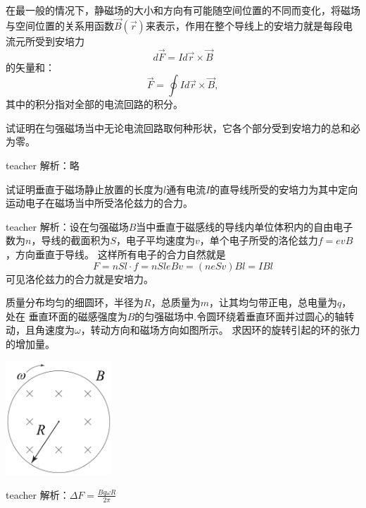 在最一般的情况下，静磁场的大小和方向有可能随空间位置的不同而变化，将磁场与空间位置的关系用函数$\vec{B}(\vec{r})$来表示，作用在整个导线上的安培力就是每段电流元所受到安培力
\begin{equation}
d\vec{F} = Id\vec{r}\times \vec{B}
\end{equation}
的矢量和：
\begin{equation}
\vec{F}=\oint Id\vec{r}\times \vec{B},
\end{equation}
其中的积分指对全部的电流回路的积分。


\begin{example}
试证明在匀强磁场当中无论电流回路取何种形状，它各个部分受到安培力的总和必为零。
\begin{taggedblock}{teacher}
\newline
解析：略
\end{taggedblock}
\end{example}

\begin{example}
试证明垂直于磁场静止放置的长度为$l$通有电流$I$的直导线所受的安培力为其中定向运动电子在磁场当中所受洛伦兹力的合力。
\begin{taggedblock}{teacher}
\newline
解析：设在匀强磁场$B$当中垂直于磁感线的导线内单位体积内的自由电子数为$n$，导线的截面积为$S$，电子平均速度为$v$，单个电子所受的洛伦兹力$f=evB$，方向垂直于导线。
这样所有电子的合力自然就是
\[F=nSl\cdot f = nSleBv = (neSv)Bl=IBl\]
可见洛伦兹力的合力就是安培力。
\end{taggedblock}
\end{example}



\begin{example}

质量分布均匀的细圆环，半径为$R $，总质量为$m$，让其均匀带正电，总电量为$q$，处在
垂直环面的磁感强度为$B$的匀强磁场中.令圆环绕着垂直环面并过圆心的轴转动，且角速度为$\omega$，转动方向和磁场方向如图所示。
求因环的旋转引起的环的张力的增加量。
\begin{flushright}
\includegraphics[width = 0.3\textwidth]{images/mag-11.pdf} 
\end{flushright}
\begin{taggedblock}{teacher}
\noindent
解析：$\Delta F=\frac{Bq\omega R}{2\pi}$
\end{taggedblock}
\end{example}

